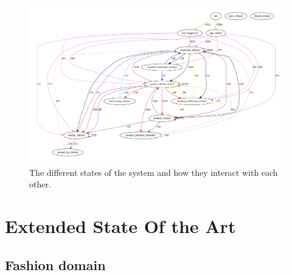     \begin{figure}[H]
        \includegraphics[angle=90,width=5in]{image/statesInteractionFalse-gvfile.pdf}
        \centering
        \caption[States in session and how they interact]{The different states of the system and how they interact with each other.}
        \label{figure:statesInteractions}
    \end{figure}

\chapter{Extended State Of the Art}
\label{app:sota}

\section{Fashion domain}

